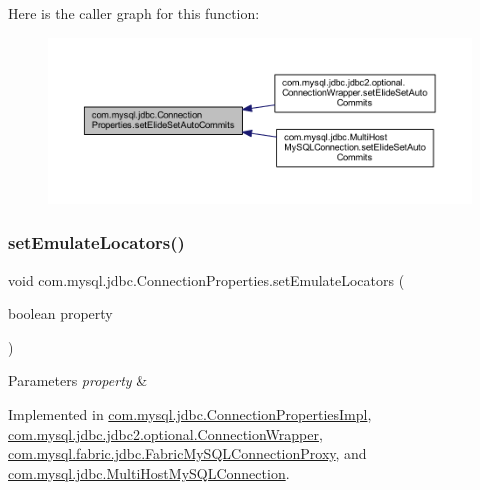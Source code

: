Here is the caller graph for this function\+:\nopagebreak
\begin{figure}[H]
\begin{center}
\leavevmode
\includegraphics[width=350pt]{interfacecom_1_1mysql_1_1jdbc_1_1_connection_properties_ae95924c9d1da3b93b44b58b33089d251_icgraph}
\end{center}
\end{figure}
\mbox{\label{interfacecom_1_1mysql_1_1jdbc_1_1_connection_properties_a3cbd4f864707e036d8013706d632a807}} 
\subsubsection{\texorpdfstring{set\+Emulate\+Locators()}{setEmulateLocators()}}
{\footnotesize\ttfamily void com.\+mysql.\+jdbc.\+Connection\+Properties.\+set\+Emulate\+Locators (\begin{DoxyParamCaption}\item[{boolean}]{property }\end{DoxyParamCaption})}


\begin{DoxyParams}{Parameters}
{\em property} & \\
\hline
\end{DoxyParams}


Implemented in \mbox{\hyperlink{classcom_1_1mysql_1_1jdbc_1_1_connection_properties_impl_ae17303315356fd3fd01afaf4f6ad153a}{com.\+mysql.\+jdbc.\+Connection\+Properties\+Impl}}, \mbox{\hyperlink{classcom_1_1mysql_1_1jdbc_1_1jdbc2_1_1optional_1_1_connection_wrapper_aa54e4168297c0975cb337fd18c989eac}{com.\+mysql.\+jdbc.\+jdbc2.\+optional.\+Connection\+Wrapper}}, \mbox{\hyperlink{classcom_1_1mysql_1_1fabric_1_1jdbc_1_1_fabric_my_s_q_l_connection_proxy_afd55a471d2ab8fc81f8590cef9886040}{com.\+mysql.\+fabric.\+jdbc.\+Fabric\+My\+S\+Q\+L\+Connection\+Proxy}}, and \mbox{\hyperlink{classcom_1_1mysql_1_1jdbc_1_1_multi_host_my_s_q_l_connection_acf59bfc5610337b83b617986cfb1b2a5}{com.\+mysql.\+jdbc.\+Multi\+Host\+My\+S\+Q\+L\+Connection}}.

